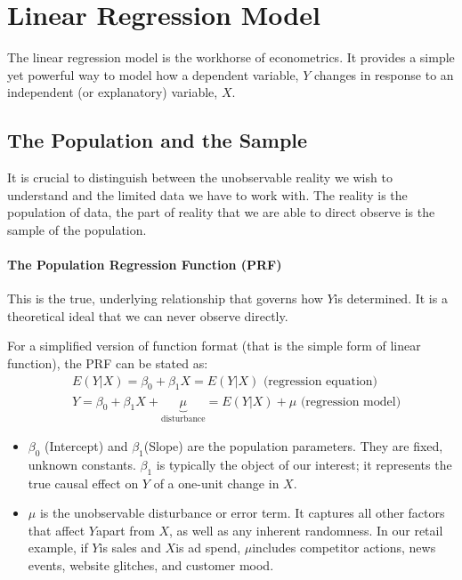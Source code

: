 \documentclass{article}
\begin{document}
\section{Linear Regression Model}

The linear regression model is the workhorse of econometrics. It provides a simple yet powerful way to model how a dependent variable, $Y$ changes in response to an independent (or explanatory) variable, $X$.

\subsection{The Population and the Sample}

It is crucial to distinguish between the unobservable reality we wish to understand and the limited data we have to work with. The reality is the population of data, the part of reality that we are able to direct observe is the sample of the population.


\paragraph{The Population Regression Function (PRF)}
This is the true, underlying relationship that governs how $Y$is determined. It is a theoretical ideal that we can never observe directly.


For a simplified version of function format (that is the simple form of linear function), the PRF can be stated as:
\begin{align}
& E(Y|X)=\beta_{0}+\beta_{1} X =E(Y|X) \text{ (regression equation)}
\\& Y= \beta_{0}+\beta_{1}X+\underbrace{\mu}_\text{disturbance}=E(Y|X)+\mu \text{ (regression model)}
\end{align}

\begin{itemize}
  \item $\beta_0$ (Intercept) and $\beta_1$(Slope) are the population parameters. They are fixed, unknown constants. $\beta_1$ is typically the object of our interest; it represents the true causal effect on $Y$ of a one-unit change in $X$.
  \item $\mu$ is the unobservable disturbance or error term. It captures all other factors that affect $Y$apart from $X$, as well as any inherent randomness. In our retail example, if $Y$is sales and $X$is ad spend, $\mu$includes competitor actions, news events, website glitches, and customer mood.
\end{itemize}
\end{document}

